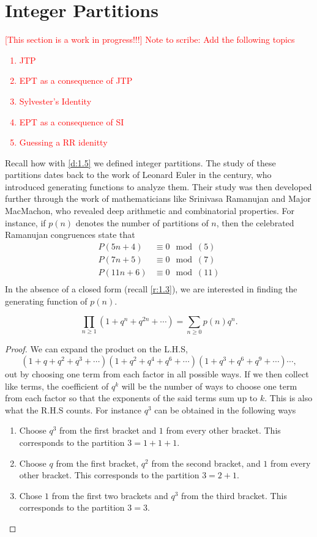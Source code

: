 \section{Integer Partitions}
\textcolor{red}{
[This section is a work in progress!!!] Note to scribe: Add the following topics
\begin{enumerate}
    \item JTP
    \item EPT as a consequence of JTP
    \item Sylvester's Identity
    \item EPT as a consequence of SI
    \item Guessing a RR idenitty
\end{enumerate}
}
Recall how with \cref{d:1.5} we defined integer partitions. The study of these partitions dates back to the work of Leonard Euler in the  century, who introduced generating functions to analyze them. Their study was then developed further through the work of mathematicians like Srinivasa Ramanujan and Major MacMachon, who revealed deep arithmetic and combinatorial properties. For instance, if $p(n)$ denotes the number of partitions of $n$, then the celebrated Ramanujan congruences state that
\begin{align*}
P(5n+4)&\equiv 0\mod{(5)} \\
P(7n+5)&\equiv 0\mod{(7)} \\
P(11n+6)&\equiv 0\mod{(11)} \\ 
\end{align*}
In the absence of a closed form (recall \cref{r:1.3}), we are interested in finding the generating function of $p(n)$.
\begin{claim}\[
\prod_{n\geq 1}(1+q^n+q^{2n}+\cdots) = \sum_{n\geq 0}p(n)q^n.
\]
\label{c:2.1P}
\end{claim}
\begin{proof}
We can expand the product on the L.H.S, \[(1+q+q^2+q^3+\cdots)(1+q^2+q^4+q^6+\cdots)(1+q^3+q^6+q^9+\cdots)\cdots,\] out by choosing one term from each factor in all possible ways. If we then collect like terms, the coefficient of $q^k$ will be the number of ways to choose one term from each factor so that the exponents of the said terms sum up to $k$. This is also what the R.H.S counts. For instance $q^3$ can be obtained in the following ways
\begin{enumerate}
    \item Choose $q^3$ from the first bracket and $1$ from every other bracket. This corresponds to the partition $3=1+1+1$.
    \item Choose $q$ from the first bracket, $q^2$ from the second bracket, and $1$ from every other bracket. This corresponds to the partition $3=2+1$. 
    \item Chose $1$ from the first two brackets and $q^3$ from the third bracket. This corresponds to the partition $3=3$. 
\end{enumerate}
\end{proof}
